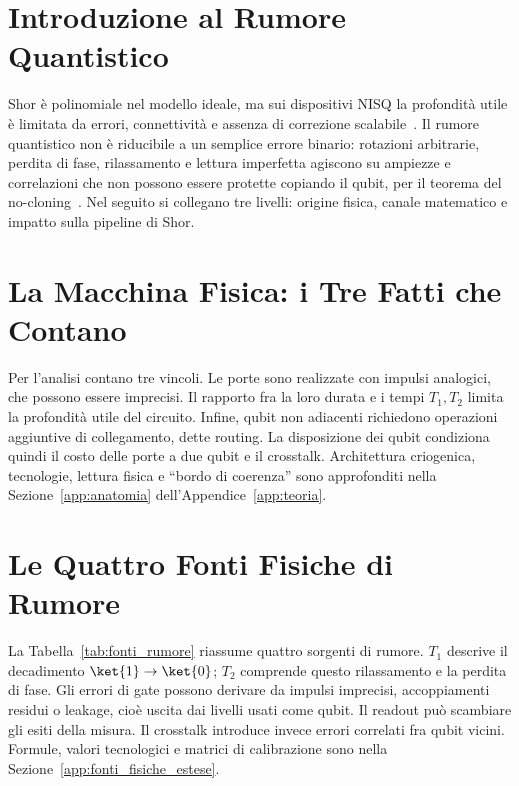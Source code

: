\begin{onehalfspace}

\section{Introduzione al Rumore Quantistico}

Shor è polinomiale nel modello ideale, ma sui dispositivi \ac{NISQ} la
profondità utile è limitata da errori, connettività e assenza di correzione
scalabile~\cite{preskill2018}. Il rumore quantistico non è riducibile a un
semplice errore binario: rotazioni arbitrarie, perdita di fase, rilassamento e
lettura imperfetta agiscono su ampiezze e correlazioni che non possono essere
protette copiando il qubit, per il teorema del no-cloning~\cite{wootters1982}.
Nel seguito si collegano tre livelli: origine fisica, canale matematico e impatto
sulla pipeline di Shor.

\section{La Macchina Fisica: i Tre Fatti che Contano}
\label{sec:anatomia_qpu}

Per l'analisi contano tre vincoli. Le porte sono realizzate con impulsi analogici, che possono essere imprecisi. Il rapporto fra la loro durata e i tempi $T_1,T_2$ limita la profondità utile del circuito. Infine, qubit non adiacenti richiedono operazioni aggiuntive di collegamento, dette routing. La disposizione dei qubit condiziona quindi il costo delle porte a due qubit e il crosstalk. Architettura criogenica, tecnologie, lettura fisica e ``bordo di coerenza'' sono approfonditi nella Sezione~\ref{app:anatomia} dell'Appendice~\ref{app:teoria}.

\section{Le Quattro Fonti Fisiche di Rumore}
\label{sec:fonti_fisiche}

La Tabella~\ref{tab:fonti_rumore} riassume quattro sorgenti di rumore. $T_1$ descrive il decadimento $\ket{1}\rightarrow\ket{0}$; $T_2$ comprende questo rilassamento e la perdita di fase. Gli errori di gate possono derivare da impulsi imprecisi, accoppiamenti residui o leakage, cioè uscita dai livelli usati come qubit. Il readout può scambiare gli esiti della misura. Il crosstalk introduce invece errori correlati fra qubit vicini. Formule, valori tecnologici e matrici di calibrazione sono nella Sezione~\ref{app:fonti_fisiche_estese}.


\end{onehalfspace}
